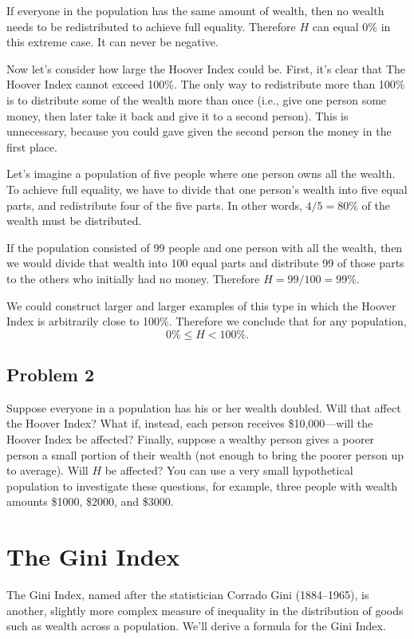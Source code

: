 \documentclass[12pt]{memoir}\usepackage[]{graphicx}\usepackage[table]{xcolor}
\begin{document}
If everyone in the population has the same amount of wealth, then no wealth
needs to be redistributed to achieve full equality.  Therefore $H$ can equal
0\% in this extreme case.  It can never be negative. 

Now let's consider how large the Hoover Index could be.  First, it's clear that
The Hoover Index cannot exceed 100\%.  The only way to redistribute more than 100\%
is to distribute some of the wealth more than once (i.e., give one person some money, then
later take it back and give it to a second person).
This is unnecessary, because you could gave given the second person the money in 
the first place.

Let's imagine a population of five people where one person owns all the wealth.
To achieve full equality, we have to divide that one person's wealth into five
equal parts, and redistribute four of the five parts.  In other words, 
$4/5 = 80\%$ of the wealth must be distributed.

If the population consisted of 99 people and one person with all the wealth, then 
we would divide that wealth into 100 equal parts and distribute 99 of those parts
to the others who initially had no money.  Therefore $H = 99/100 = 99\%$. 

We could construct larger and larger examples of this type in which the Hoover
Index is arbitrarily close to 100\%.  Therefore we conclude that for any 
population, $$0\% \le H < 100\%.$$

\subsection*{Problem 2}

Suppose everyone in a population has his or her wealth doubled.  Will
that affect the Hoover Index?  What if, instead, each person receives 
\$10{,}000---will the Hoover Index be affected?  Finally, suppose a wealthy person
gives a poorer person a small portion of their wealth (not enough to bring the poorer 
person up to average).  Will $H$ be affected?  You can use a very small
hypothetical population to investigate these questions, for example, three people
with wealth amounts \$1000, \$2000, and \$3000.

\newpage
\section*{The Gini Index}

The Gini Index, named after the statistician Corrado Gini (1884--1965), is 
another, slightly more complex measure of inequality in the distribution of 
goods such as wealth across a population.  We'll derive a formula for the 
Gini Index.
\end{document}
